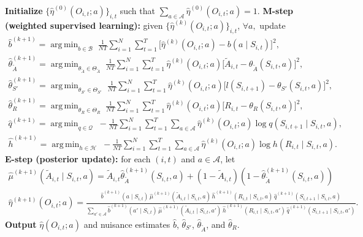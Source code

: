 \documentclass[12pt]{article}
\DeclareMathOperator*{\argmin}{arg\,min}
\newcommand{\0}{\boldsymbol{0}}
\begin{document}
\begin{algorithm}[t]
\caption{Iterative latent-action reweighting}
\label{alg:latent_action_em}
\begin{algorithmic}[1]
\State \textbf{Initialize} $\{\widehat \eta^{(0)}(O_{i,t};a)\}_{i,t}$ such that $\sum_{a\in\mathcal A}\widehat \eta^{(0)}(O_{i,t};a)=1$.
\Repeat
\State \textbf{M-step (weighted supervised learning):} given $\{\widehat \eta^{(k)}(O_{i,t};a)\}_{i,t}$, $\forall a,$ update
\[
\begin{gathered}
\widehat b^{(k+1)}
=\argmin_{b \in \mathcal{B}}\; \frac{1}{NT} \sum_{i=1}^N\sum_{t=1}^T \big[\widehat \eta^{(k)}(O_{i,t};a)-b(a\mid S_{i,t})\big]^2, \\
\widehat \theta_{\widetilde A}^{(k+1)}
=\argmin_{\theta_{\widetilde A} \in \Theta_{\widetilde A}}\; \frac{1}{NT} \sum_{i=1}^N\sum_{t=1}^T \widehat \eta^{(k)}(O_{i,t};a)\big[\widetilde A_{i,t}-\theta_{\widetilde A}(S_{i,t},a)\big]^2, \\
\widehat \theta_{S'}^{(k+1)}
=\argmin_{\theta_{ S'} \in \Theta_{ S'}}\; \frac{1}{NT} \sum_{i=1}^N\sum_{t=1}^T \widehat \eta^{(k)}(O_{i,t};a)\big[ l(S_{i,t+1})-\theta_{S'}(S_{i,t},a)\big]^2, \\
\widehat\theta_R^{(k+1)}
=\argmin_{\theta_R\in \Theta_R}\; \frac{1}{NT}\sum_{i=1}^N\sum_{t=1}^T \widehat \eta^{(k)}(O_{i,t};a)\big[R_{i,t}-\theta_R(S_{i,t},a)\big]^2, \\
\widehat q^{(k+1)}
=\argmin_{q\in\mathcal Q}\; -\frac{1}{NT}\sum_{i=1}^N\sum_{t=1}^T \sum_{a \in \mathcal A} \widehat \eta^{(k)}(O_{i,t};a)\log q(S_{i,t+1}\mid S_{i,t},a), \\
\widehat h^{(k+1)}
=\argmin_{h\in\mathcal H}\; -\frac{1}{NT}\sum_{i=1}^N\sum_{t=1}^T \sum_{a \in \mathcal A} \widehat \eta^{(k)}(O_{i,t};a)\log h(R_{i,t}\mid S_{i,t},a).
\end{gathered}
\]
\State \textbf{E-step (posterior update):} for each $(i,t)$ and $a\in\mathcal A$, let 
\begin{gather*}
\nonumber \widehat \mu^{(k+1)}(\widetilde A_{i,t}\mid S_{i,t},a)=\widetilde A_{i,t}\widehat \theta_{\widetilde A}^{(k+1)}(S_{i,t},a)+(1-\widetilde A_{i,t})\left(1-\widehat \theta_{\widetilde A}^{(k+1)}(S_{i,t},a)\right) \\
\widehat \eta^{(k+1)}(O_{i,t};a)
=
\frac{
\widehat b^{(k+1)}(a\mid S_{i,t})\,
\widehat \mu^{(k+1)}(\widetilde A_{i,t}\mid S_{i,t},a)\,
\widehat h^{(k+1)}(R_{i,t}\mid S_{i,t},a)\,
\widehat q^{(k+1)}(S_{i,t+1}\mid S_{i,t},a)
}{
\sum_{a' \in\mathcal A}
\widehat b^{(k+1)}(a'\mid S_{i,t})\,
\widehat \mu^{(k+1)}(\widetilde A_{i,t}\mid S_{i,t},a')\,
\widehat h^{(k+1)}(R_{i,t}\mid S_{i,t},a')\,
\widehat q^{(k+1)}(S_{i,t+1}\mid S_{i,t},a')
}.
\end{gather*}
\State \textbf{Output} $\widehat \eta(O_{i,t};a)$ and nuisance estimates
$\widehat b$, $\widehat\theta_{S'}$, $\widehat\theta_{\widetilde A}$, and $\widehat\theta_R$.
\end{algorithmic}
\end{algorithm}
\end{document}
